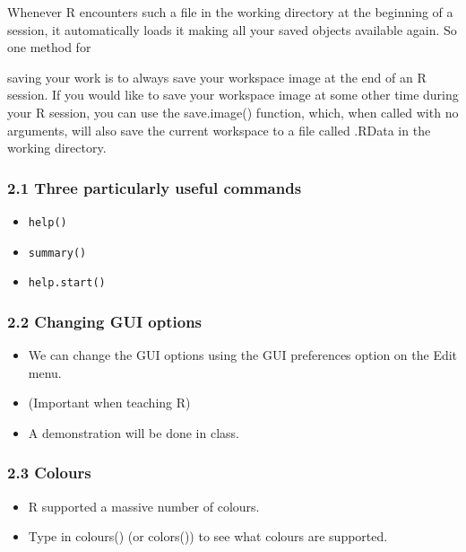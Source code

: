 \documentclass{beamer}
\begin{document}
 \begin{frame}
 	Whenever R encounters such a file in the working directory at the beginning of a session,
 	it automatically loads it making all your saved objects available again. So one method for
 	
 	saving your work is to always save your workspace image at the end of an R session. If you
 	would like to save your workspace image at some other time during your R session, you can use
 	the save.image() function, which, when called with no arguments, will also save the current
 	workspace to a file called .RData in the working directory.
 	
 \end{frame}
 
 \begin{frame}
 	\frametitle{2.1 Three particularly useful commands}
 	
 	\begin{itemize}
 		\item \texttt{help()}
 		\item \texttt{summary()}
 		\item \texttt{help.start()}
 	\end{itemize}
 	
 \end{frame}
 \begin{frame}
 	\frametitle{2.2 Changing GUI options}
 	\begin{itemize}
 		\item We can change the GUI options using the GUI preferences option on the Edit menu.
 		\item  (Important
 		when teaching R) 
 		\item A demonstration will be done in class.
 	\end{itemize}
 	
 \end{frame}
 \begin{frame}
 	\frametitle{2.3 Colours}
 	\begin{itemize}
 		\item R supported a massive number of colours.
 		\item Type in colours() (or colors()) to see what colours
 		are supported.
 	\end{itemize}
 \end{frame}
 
\end{document}
